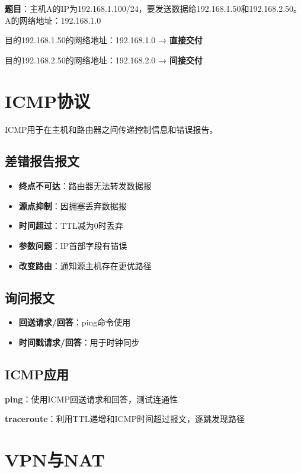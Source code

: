 \begin{examplebox}[例题4.6 IP转发判断]
\textbf{题目}：主机A的IP为192.168.1.100/24，要发送数据给192.168.1.50和192.168.2.50。
\tcblower
A的网络地址：192.168.1.0

目的192.168.1.50的网络地址：192.168.1.0 → \textbf{直接交付}

目的192.168.2.50的网络地址：192.168.2.0 → \textbf{间接交付}
\end{examplebox}

\section{ICMP协议}
ICMP用于在主机和路由器之间传递控制信息和错误报告。

\subsection{差错报告报文}
\begin{itemize}[leftmargin=2em,itemsep=0pt]
    \item \textbf{终点不可达}：路由器无法转发数据报
    \item \textbf{源点抑制}：因拥塞丢弃数据报
    \item \textbf{时间超过}：TTL减为0时丢弃
    \item \textbf{参数问题}：IP首部字段有错误
    \item \textbf{改变路由}：通知源主机存在更优路径
\end{itemize}

\subsection{询问报文}
\begin{itemize}[leftmargin=2em,itemsep=0pt]
    \item \textbf{回送请求/回答}：ping命令使用
    \item \textbf{时间戳请求/回答}：用于时钟同步
\end{itemize}

\subsection{ICMP应用}
\textbf{ping}：使用ICMP回送请求和回答，测试连通性

\textbf{traceroute}：利用TTL递增和ICMP时间超过报文，逐跳发现路径

\section{VPN与NAT}
